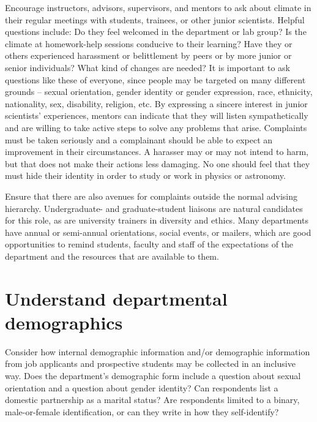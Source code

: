 Encourage instructors, advisors, supervisors, and mentors to ask about climate in their regular meetings with students, trainees, or other junior scientists. Helpful questions include: Do they feel welcomed in the department or lab group? Is the climate at homework-help sessions conducive to their learning? Have they or others experienced harassment or belittlement by peers or by more junior or senior individuals? What kind of changes are needed? It is important to ask questions like these of everyone, since people may be targeted on many different grounds -- sexual orientation, gender identity or gender expression, race, ethnicity, nationality, sex, disability, religion, etc. By expressing a sincere interest in junior scientists' experiences, mentors can indicate that they will listen sympathetically and are willing to take active steps to solve any problems that arise. Complaints must be taken seriously and a complainant should be able to expect an improvement in their circumstances. A harasser may or may not intend to harm, but that does not make their actions less damaging. No one should feel that they must hide their identity in order to study or work in physics or astronomy.

Ensure that there are also avenues for complaints outside the normal advising hierarchy. Undergraduate- and graduate-student liaisons are natural candidates for this role, as are university trainers in diversity and ethics. Many departments have annual or semi-annual orientations, social events, or mailers, which are good opportunities to remind students, faculty and staff of the expectations of the department and the resources that are available to them.



\section {Understand departmental demographics}
\label{demographics}
Consider how internal demographic information and/or demographic information from job applicants and prospective students may be collected in an inclusive way. Does the department's demographic form include a question about sexual orientation and a question about gender identity? Can respondents list a domestic partnership as a marital status? Are respondents limited to a binary, male-or-female identification, or can they write in how they self-identify?

